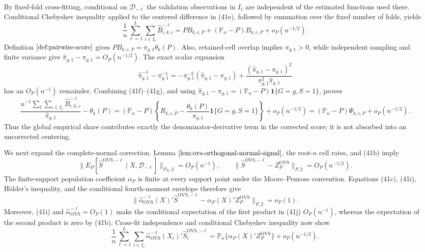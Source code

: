 By fixed-fold cross-fitting, conditional on \(\mathcal D_{-\ell}\) the validation observations in \(I_\ell\) are independent of the estimated functions used there.  Conditional Chebyshev inequality applied to the centered difference in (41e), followed by summation over the fixed number of folds, yields
\[
\frac1n\sum_{\ell=1}^L\sum_{i\in I_\ell}
\widehat B_{i,k,c}^{-\ell}
=P B_{k,c,P}+(\mathbb P_n-P)B_{k,c,P}+o_P(n^{-1/2}).
\tag{41f}
\]
Definition \(\ref{def:pairwise-score}\) gives \(P B_{k,c,P}=\pi_{g,1}\theta_k(P)\).  Also, retained-cell overlap implies \(\pi_{g,1}>0\), while independent sampling and finite variance give \(\widehat\pi_{g,1}-\pi_{g,1}=O_P(n^{-1/2})\).  The exact scalar expansion
\[
\widehat\pi_{g,1}^{-1}-\pi_{g,1}^{-1}
=-\pi_{g,1}^{-2}(\widehat\pi_{g,1}-\pi_{g,1})
+\frac{(\widehat\pi_{g,1}-\pi_{g,1})^2}
{\pi_{g,1}^2\widehat\pi_{g,1}}
\tag{41g}
\]
has an \(O_P(n^{-1})\) remainder.  Combining (41f)--(41g), and using
\(\widehat\pi_{g,1}-\pi_{g,1}=(\mathbb P_n-P)\mathbf 1\{G=g,S=1\}\), proves
\[
\frac{n^{-1}\sum_{\ell}\sum_{i\in I_\ell}\widehat B_{i,k,c}^{-\ell}}
{\widehat\pi_{g,1}}-\theta_k(P)
=(\mathbb P_n-P)\left\{
R_{k,c,P}-\frac{\theta_k(P)}{\pi_{g,1}}\mathbf 1\{G=g,S=1\}
\right\}+o_P(n^{-1/2})
=(\mathbb P_n-P)\Psi_{k,c,P}+o_P(n^{-1/2}).
\tag{41h}
\]
Thus the global empirical share contributes exactly the denominator-derivative term in the corrected score; it is not absorbed into an uncorrected centering.

We next expand the complete-normal correction.  Lemma \(\ref{lem:ovs-orthogonal-normal-signal}\), the root-\(n\) cell rates, and (41b) imply
\[
\|E_P[\widehat S^{\mathrm{OVS},-\ell}\mid X,\mathcal D_{-\ell}]\|_{P_X,2}
=O_P(n^{-1}),
\qquad
\|\widehat S^{\mathrm{OVS},-\ell}-Z_P^{\mathrm{OVS}}\|_{P,2}=O_P(n^{-1/2}).
\tag{41i}
\]
The finite-support population coefficient \(\alpha_P\) is finite at every support point under the Moore--Penrose convention.  Equations (41c), (41i), H\"older's inequality, and the conditional fourth-moment envelope therefore give
\[
\|\widehat\alpha_{\mathrm{OVS}}^{-\ell}(X)'
\widehat S^{\mathrm{OVS},-\ell}
-\alpha_P(X)'Z_P^{\mathrm{OVS}}\|_{P,2}=o_P(1).
\tag{41j}
\]
Moreover, (41i) and \(\widehat\alpha_{\mathrm{OVS}}^{-\ell}=O_P(1)\) make the conditional expectation of the first product in (41j) \(O_P(n^{-1})\), whereas the expectation of the second product is zero by (41b).  Cross-fit independence and conditional Chebyshev inequality now show
\[
\frac1n\sum_{\ell=1}^L\sum_{i\in I_\ell}
\widehat\alpha_{\mathrm{OVS}}^{-\ell}(X_i)'
\widehat S_i^{\mathrm{OVS},-\ell}
=\mathbb P_n\{\alpha_P(X)'Z_P^{\mathrm{OVS}}\}+o_P(n^{-1/2}).
\tag{41k}
\]


